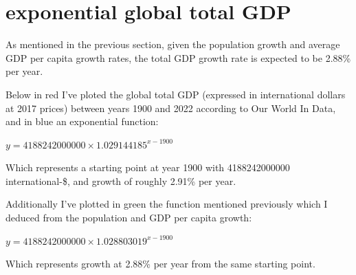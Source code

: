 \documentclass{article}
\begin{document}
	\pagebreak
	
	\section{exponential global total GDP}
	
	As mentioned in the previous section, given the population growth and average GDP per capita growth rates, the total GDP growth rate is expected to be 2.88\% per year.
	
	\medskip
	
	Below in red I've ploted the global total GDP (expressed in international dollars at 2017 prices) between years 1900 and 2022 according to Our World In Data, and in blue an exponential function:
	
	\begin{center}
		{\large $ y = 4188242000000 \times 1.029144185^{x-1900} $}
	\end{center}
	
	\noindent Which represents a starting point at year 1900 with 4188242000000 international-\$, and growth of roughly 2.91\% per year.
	
	\bigskip
	
	Additionally I've plotted in green the function mentioned previously which I deduced from the population and GDP per capita growth:
	
	\begin{center}
		{\large $ y = 4188242000000 \times 1.028803019^{x-1900} $}
	\end{center}

	\noindent Which represents growth at 2.88\% per year from the same starting point.
	
	\medskip
	
\end{document}
